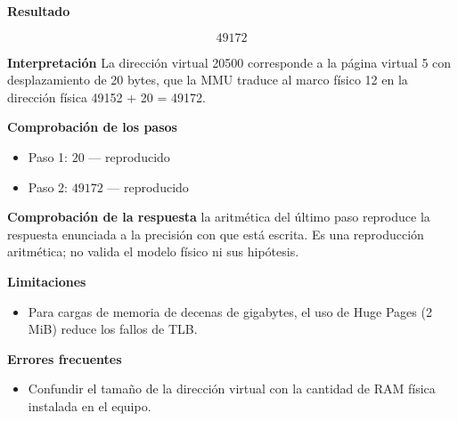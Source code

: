 \documentclass{book}
\begin{document}
\begin{tcolorbox}[title={Problema resuelto}, studiumworked, breakable]
\noindent\textbf{Resultado}

\[
49172
\]

\noindent\textbf{Interpretación}
La dirección virtual 20500 corresponde a la página virtual 5 con desplazamiento de 20 bytes, que la MMU traduce al marco físico 12 en la dirección física 49152 + 20 = 49172.

\noindent\textbf{Comprobación de los pasos}
\begin{itemize}
\item Paso 1: $20$ — reproducido
\item Paso 2: $49172$ — reproducido
\end{itemize}

\noindent\textbf{Comprobación de la respuesta} la aritmética del último paso reproduce la respuesta enunciada a la precisión con que está escrita. Es una reproducción aritmética; no valida el modelo físico ni sus hipótesis.

\noindent\textbf{Limitaciones}
\begin{itemize}
\item Para cargas de memoria de decenas de gigabytes, el uso de Huge Pages (2 MiB) reduce los fallos de TLB.
\end{itemize}

\noindent\textbf{Errores frecuentes}
\begin{itemize}
\item Confundir el tamaño de la dirección virtual con la cantidad de RAM física instalada en el equipo.
\end{itemize}
\end{tcolorbox}
\end{document}
